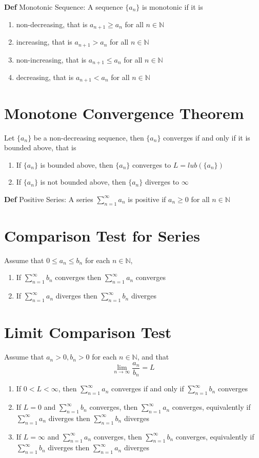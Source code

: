 \documentclass[11pt,notitlepage]{report}
\begin{document}
\textbf{Def} Monotonic Sequence: A sequence $\{a_n\}$ is monotonic if it is
\begin{enumerate}
    \item non-decreasing, that is $a_{n+1} \geq a_n$ for all $n \in \mathbb N$
    \item increasing, that is $a_{n+1} > a_n$ for all $n \in \mathbb N$
    \item non-increasing, that is $a_{n+1} \leq a_n$ for all $n \in \mathbb N$
    \item decreasing, that is $a_{n+1} < a_n$ for all $n \in \mathbb N$
\end{enumerate}

\section{Monotone Convergence Theorem}Let $\{a_n\}$ be a non-decreasing sequence, then $\{a_n\}$ converges if and only if it is bounded above, that is
\begin{enumerate}
    \item If $\{a_n\}$ is bounded above, then $\{a_n\}$ converges to $L = lub(\{a_n\})$
    \item If $\{a_n\}$ is not bounded above, then $\{a_n\}$ diverges to $\infty$
\end{enumerate}

\textbf{Def} Positive Series: A series $\sum_{n=1}^\infty a_n$ is positive if $a_n \geq 0$ for all $n \in \mathbb N$

\section{Comparison Test for Series}Assume that $0 \leq a_n \leq b_n$ for each $n \in \mathbb N$,
\begin{enumerate}
    \item If $\sum_{n=1}^\infty b_n$ converges then $\sum_{n=1}^\infty a_n$ converges
    \item If $\sum_{n=1}^\infty a_n$ diverges then $\sum_{n=1}^\infty b_n$ diverges
\end{enumerate}

\section{Limit Comparison Test}Assume that $a_n > 0, b_n > 0$ for each $n \in \mathbb N$, and that $$\lim_{n \to \infty} \frac{a_n}{b_n} = L$$
\begin{enumerate}
    \item If $0 < L < \infty$, then $\sum_{n=1}^\infty a_n$ converges if and only if $\sum_{n=1}^\infty b_n$ converges
    \item If $L = 0$ and $\sum_{n=1}^\infty b_n$ converges, then $\sum_{n=1}^\infty a_n$ converges, equivalently if $\sum_{n=1}^\infty a_n$ diverges then $\sum_{n=1}^\infty b_n$ diverges
    \item If $L = \infty$ and $\sum_{n=1}^\infty a_n$ converges, then $\sum_{n=1}^\infty b_n$ converges, equivalently if $\sum_{n=1}^\infty b_n$ diverges then $\sum_{n=1}^\infty a_n$ diverges
\end{enumerate}
\newpage
\end{document}
